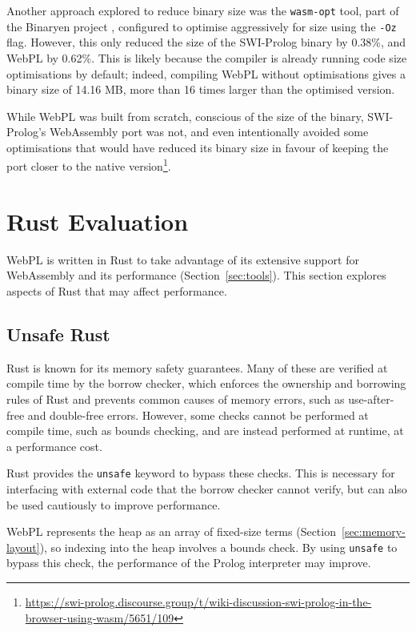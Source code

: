 \vspace*{-1.5em}

Another approach explored to reduce binary size was the \texttt{wasm-opt} tool, part of the Binaryen project \cite{zakaiBinaryenhttpsgithubcom2015}, configured to optimise aggressively for size using the \texttt{-Oz} flag. However, this only reduced the size of the SWI-Prolog binary by 0.38\%, and WebPL by 0.62\%. This is likely because the compiler is already running code size optimisations by default; indeed, compiling WebPL without optimisations gives a binary size of 14.16 MB, more than 16 times larger than the optimised version.

While WebPL was built from scratch, conscious of the size of the binary, SWI-Prolog's WebAssembly port was not, and even intentionally avoided some optimisations that would have reduced its binary size in favour of keeping the port closer to the native version\footnote{\url{https://swi-prolog.discourse.group/t/wiki-discussion-swi-prolog-in-the-browser-using-wasm/5651/109}}.

\section{Rust Evaluation}

\label{sec:rust-evaluation}

WebPL is written in Rust to take advantage of its extensive support for WebAssembly and its performance (Section~\ref{sec:tools}). This section explores aspects of Rust that may affect performance.

\subsection{Unsafe Rust}

Rust is known for its memory safety guarantees. Many of these are verified at compile time by the borrow checker, which enforces the ownership and borrowing rules of Rust and prevents common causes of memory errors, such as use-after-free and double-free errors. However, some checks cannot be performed at compile time, such as bounds checking, and are instead performed at runtime, at a performance cost.

Rust provides the \texttt{unsafe} keyword to bypass these checks. This is necessary for interfacing with external code that the borrow checker cannot verify, but can also be used cautiously to improve performance.

WebPL represents the heap as an array of fixed-size terms (Section~\ref{sec:memory-layout}), so indexing into the heap involves a bounds check. By using \texttt{unsafe} to bypass this check, the performance of the Prolog interpreter may improve.


